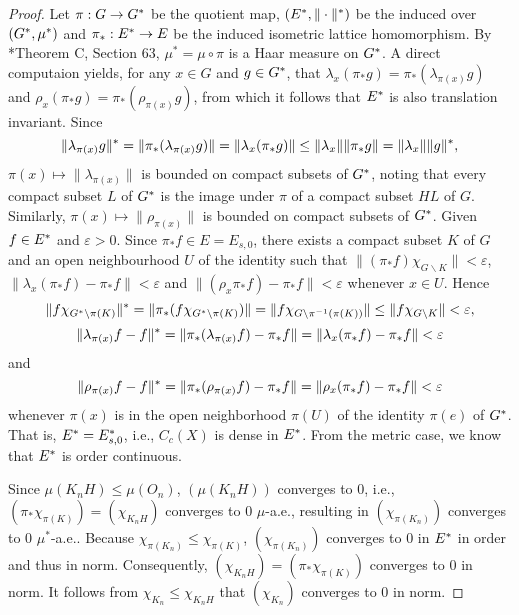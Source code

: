 \begin{proof}
Let $\pi:G\to G^*$ be the quotient map, $(E^*,\|\cdot\|^*)$ be the induced \bfs over $(G^*,\mu^*)$ and $\pi_*:E^*\to E$ be the induced isometric lattice homomorphism. By \cite{Measure_Theory}*{Theorem C, Section 63}, $\mu^*=\mu\circ\pi$ is a Haar measure on $G^*$. 
A direct computaion yields, for any $x\in G$ and $g\in G^*$, that  
$\lambda_x(\pi_*g)=\pi_*(\lambda_{\pi(x)}g)$ and
$\rho_x( \pi_*g)=\pi_*(\rho_{\pi(x)}g)$,
from  which it follows that $E^*$ is also translation invariant. Since  
$$\|\lambda_{\pi(x)} g\|^*=\|\pi_*(\lambda_{\pi(x)}g)\|=\|\lambda_x(\pi_*g)\|\leq\|\lambda_x\|\|\pi_*g\|=\|\lambda_x\|\|g\|^*,$$
$\pi(x)\mapsto\|\lambda_{\pi(x)}\|$ is bounded on compact subsets of $G^*$,  noting that every compact subset $L$ of $G^*$ is the image under $\pi$ of a compact    subset $HL$ of $G$. Similarly, $\pi(x)\mapsto\|\rho_{\pi(x)}\|$ is bounded on compact subsets of $G^*$.
   Given $f\in E^*$ and $\varepsilon>0$. Since $\pi_*f\in E=E_{s,0}$, there exists a compact subset $K$ of $G$ and an open neighbourhood $U$ of the identity such that $\|(\pi_*f)\chi_{G\backslash K}\|<\varepsilon$, $\|\lambda_x(\pi_*f)-\pi_*f\|<\varepsilon$ and $\|(\rho_x\pi_*f)-\pi_*f\|<\varepsilon$ whenever $x\in U$. Hence $$\|f\chi_{G^*\backslash \pi(K)}\|^*=\|\pi_*(f\chi_{G^*\backslash \pi(K)})\|=\|f\chi_{G\backslash \pi^{-1}(\pi(K))}\|\leq\|f\chi_{G\backslash K}\|< \varepsilon,$$ $$\|\lambda_{\pi(x)}f-f\|^*=\|\pi_*(\lambda_{\pi(x)}f)-\pi_*f\|=\|\lambda_x(\pi_*f)-\pi_*f\|<\varepsilon$$ and $$\|\rho_{\pi(x)}f-f\|^*=\|\pi_*(\rho_{\pi(x)}f)-\pi_*f\|=\|\rho_x(\pi_*f)-\pi_*f\|<\varepsilon$$
   whenever $\pi(x)$ is in the open neighborhood $\pi(U)$ of the identity $\pi(e)$ of $G^*$. That is,
$E^*=E^*_{s,0}$, i.e., $C_c(X)$ is dense in $E^*$. 
 From the metric case, we know that $E^*$ is order continuous.

Since $\mu(K_nH)\leq\mu(O_n)$, $(\mu(K_nH))$ converges to $0$, i.e., $(\pi_*\chi_{\pi(K)})=(\chi_{K_nH})$ converges to $0$ $\mu$-a.e., resulting in $(\chi_{\pi(K_n)})$ converges to $0$ $\mu^*$-a.e.. Because $\chi_{\pi(K_n)}\leq\chi_{\pi(K)}$, $(\chi_{\pi(K_n)})$ converges to $0$ in $E^*$  in order and thus in norm. Consequently, $(\chi_{K_nH})=(\pi_*\chi_{\pi(K)})$ converges to $0$ in norm. It follows from $\chi_{K_n}\leq \chi_{K_nH}$  that $(\chi_{K_n})$ converges to $0$  in norm.
\end{proof}

